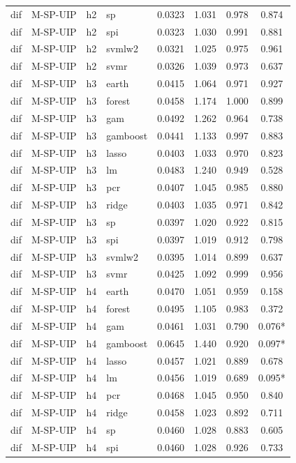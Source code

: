 \begin{ThreePartTable}
\begin{longtable}[t]{llclcccc}
dif & M-SP-UIP & h2 & sp & 0.0323 & 1.031 & 0.978 & 0.874\\
dif & M-SP-UIP & h2 & spi & 0.0323 & 1.030 & 0.991 & 0.881\\
dif & M-SP-UIP & h2 & svmlw2 & 0.0321 & 1.025 & 0.975 & 0.961\\
dif & M-SP-UIP & h2 & svmr & 0.0326 & 1.039 & 0.973 & 0.637\\
\addlinespace
dif & M-SP-UIP & h3 & earth & 0.0415 & 1.064 & 0.971 & 0.927\\
dif & M-SP-UIP & h3 & forest & 0.0458 & 1.174 & 1.000 & 0.899\\
dif & M-SP-UIP & h3 & gam & 0.0492 & 1.262 & 0.964 & 0.738\\
dif & M-SP-UIP & h3 & gamboost & 0.0441 & 1.133 & 0.997 & 0.883\\
dif & M-SP-UIP & h3 & lasso & 0.0403 & 1.033 & 0.970 & 0.823\\
dif & M-SP-UIP & h3 & lm & 0.0483 & 1.240 & 0.949 & 0.528\\
dif & M-SP-UIP & h3 & pcr & 0.0407 & 1.045 & 0.985 & 0.880\\
dif & M-SP-UIP & h3 & ridge & 0.0403 & 1.035 & 0.971 & 0.842\\
dif & M-SP-UIP & h3 & sp & 0.0397 & 1.020 & 0.922 & 0.815\\
dif & M-SP-UIP & h3 & spi & 0.0397 & 1.019 & 0.912 & 0.798\\
dif & M-SP-UIP & h3 & svmlw2 & 0.0395 & 1.014 & 0.899 & 0.637\\
dif & M-SP-UIP & h3 & svmr & 0.0425 & 1.092 & 0.999 & 0.956\\
\addlinespace
dif & M-SP-UIP & h4 & earth & 0.0470 & 1.051 & 0.959 & 0.158\\
dif & M-SP-UIP & h4 & forest & 0.0495 & 1.105 & 0.983 & 0.372\\
dif & M-SP-UIP & h4 & gam & 0.0461 & 1.031 & 0.790 & 0.076*\\
dif & M-SP-UIP & h4 & gamboost & 0.0645 & 1.440 & 0.920 & 0.097*\\
dif & M-SP-UIP & h4 & lasso & 0.0457 & 1.021 & 0.889 & 0.678\\
dif & M-SP-UIP & h4 & lm & 0.0456 & 1.019 & 0.689 & 0.095*\\
dif & M-SP-UIP & h4 & pcr & 0.0468 & 1.045 & 0.950 & 0.840\\
dif & M-SP-UIP & h4 & ridge & 0.0458 & 1.023 & 0.892 & 0.711\\
dif & M-SP-UIP & h4 & sp & 0.0460 & 1.028 & 0.883 & 0.605\\
dif & M-SP-UIP & h4 & spi & 0.0460 & 1.028 & 0.926 & 0.733\\

\end{longtable}
\end{ThreePartTable}
